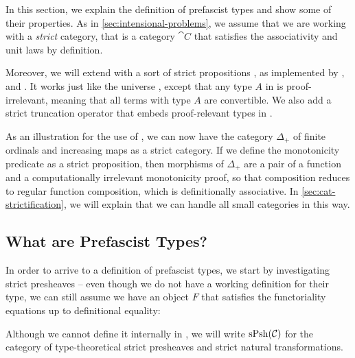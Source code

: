In this section, we explain the definition of prefascist types and show some of 
their properties.
% 
As in \cref{sec:intensional-problems}, we assume that we are working with a 
\emph{strict} category, that is a category \( \cat{C} \) that satisfies the 
associativity and unit laws by definition. 

Moreover, we will extend \MLTT with a sort of strict propositions ,
as implemented by \Coq, \Agda and \Lean {}.
% 
It works just like the universe , except that any type \( A \) 
in  is proof-irrelevant, meaning that all terms with type 
\( A \) are convertible.
% 
We also add a strict truncation operator  that embeds 
proof-relevant types in .

As an illustration for the use of , we can now have the category 
\( \Delta_+ \) of finite ordinals and increasing maps as a strict category.
If we define the monotonicity predicate as a strict proposition, then 
morphisms of \( \Delta_+ \) are a pair of a function and a computationally
irrelevant monotonicity proof, so that composition reduces to regular function 
composition, which is definitionally associative.
% 
In \cref{sec:cat-strictification}, we will explain that we can handle all small
categories in this way.

\subsection{What are Prefascist Types?}

In order to arrive to a definition of prefascist types, we start by 
investigating strict presheaves -- even though we do not have a working 
definition for their type, we can still assume we have an object \( F \)
that satisfies the functoriality equations up to definitional equality:


Although we cannot define it internally in \MLTT, we will write 
\( \mathrm{sPsh}(\mathcal{C}) \) for the category of type-theoretical strict presheaves
and strict natural transformations.

